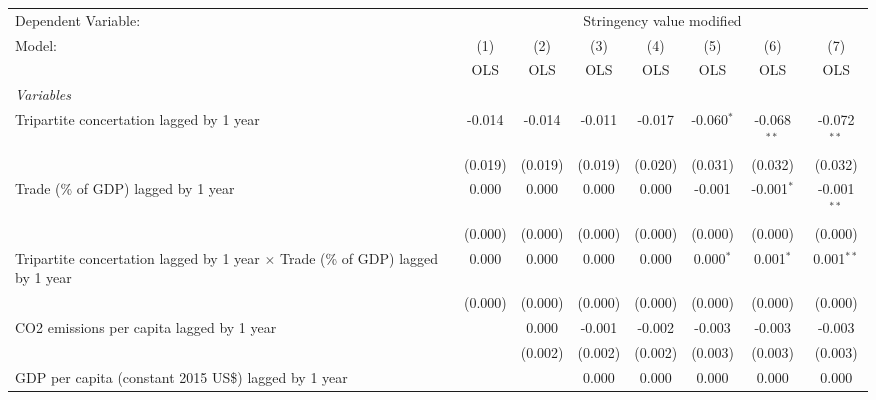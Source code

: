 
\begingroup
\centering
\begin{tabular}{lccccccc}
   \toprule
   Dependent Variable: & \multicolumn{7}{c}{Stringency value modified}\\
   Model:                                                                                 & (1)     & (2)     & (3)     & (4)     & (5)          & (6)           & (7)\\  
                                                                                          &  OLS    & OLS     & OLS     & OLS     & OLS          & OLS           & OLS\\  
   \midrule
   \emph{Variables}\\
   Tripartite concertation lagged by 1 year                                               & -0.014  & -0.014  & -0.011  & -0.017  & -0.060$^{*}$ & -0.068$^{**}$ & -0.072$^{**}$\\   
                                                                                          & (0.019) & (0.019) & (0.019) & (0.020) & (0.031)      & (0.032)       & (0.032)\\   
   Trade (\% of GDP) lagged by 1 year                                                     & 0.000   & 0.000   & 0.000   & 0.000   & -0.001       & -0.001$^{*}$  & -0.001$^{**}$\\   
                                                                                          & (0.000) & (0.000) & (0.000) & (0.000) & (0.000)      & (0.000)       & (0.000)\\   
   Tripartite concertation lagged by 1 year $\times$ Trade (\% of GDP) lagged by 1 year   & 0.000   & 0.000   & 0.000   & 0.000   & 0.000$^{*}$  & 0.001$^{*}$   & 0.001$^{**}$\\   
                                                                                          & (0.000) & (0.000) & (0.000) & (0.000) & (0.000)      & (0.000)       & (0.000)\\   
   CO2 emissions per capita lagged by 1 year                                              &         & 0.000   & -0.001  & -0.002  & -0.003       & -0.003        & -0.003\\   
                                                                                          &         & (0.002) & (0.002) & (0.002) & (0.003)      & (0.003)       & (0.003)\\   
   GDP per capita (constant 2015 US\$) lagged by 1 year                                   &         &         & 0.000   & 0.000   & 0.000        & 0.000         & 0.000\\   

\end{tabular}
